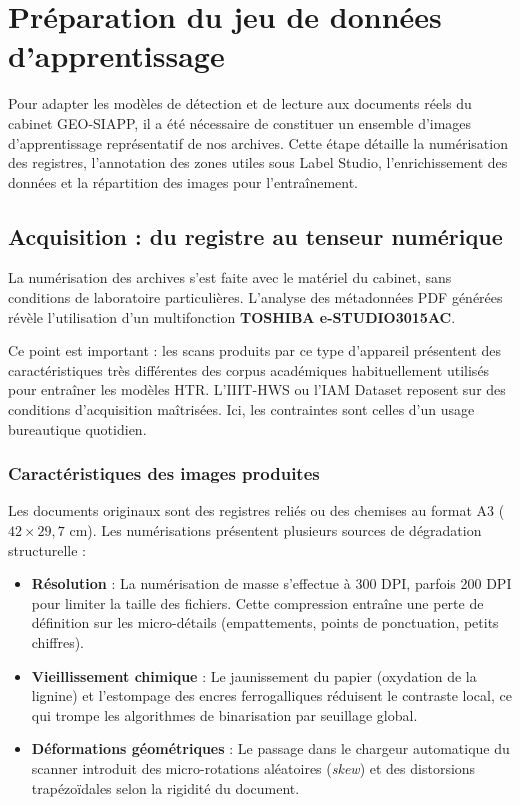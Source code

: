 \section{Préparation du jeu de données d'apprentissage}
\label{sec:dataset}

Pour adapter les modèles de détection et de lecture aux documents réels du cabinet GEO-SIAPP, il a été nécessaire de constituer un ensemble d'images d'apprentissage représentatif de nos archives. Cette étape détaille la numérisation des registres, l'annotation des zones utiles sous Label Studio, l'enrichissement des données et la répartition des images pour l'entraînement.


\subsection{Acquisition : du registre au tenseur numérique}

La numérisation des archives s'est faite avec le matériel du cabinet, sans conditions de laboratoire particulières. L'analyse des métadonnées PDF générées révèle l'utilisation d'un multifonction \textbf{TOSHIBA e-STUDIO3015AC}.

Ce point est important : les scans produits par ce type d'appareil présentent des caractéristiques très différentes des corpus académiques habituellement utilisés pour entraîner les modèles HTR. L'IIIT-HWS ou l'IAM Dataset reposent sur des conditions d'acquisition maîtrisées. Ici, les contraintes sont celles d'un usage bureautique quotidien.

\subsubsection{Caractéristiques des images produites}

Les documents originaux sont des registres reliés ou des chemises au format A3 ($42 \times 29{,}7$ cm). Les numérisations présentent plusieurs sources de dégradation structurelle :
\begin{itemize}
    \item \textbf{Résolution} : La numérisation de masse s'effectue à 300 DPI, parfois 200 DPI pour limiter la taille des fichiers. Cette compression entraîne une perte de définition sur les micro-détails (empattements, points de ponctuation, petits chiffres).
    \item \textbf{Vieillissement chimique} : Le jaunissement du papier (oxydation de la lignine) et l'estompage des encres ferrogalliques réduisent le contraste local, ce qui trompe les algorithmes de binarisation par seuillage global.
    \item \textbf{Déformations géométriques} : Le passage dans le chargeur automatique du scanner introduit des micro-rotations aléatoires (\textit{skew}) et des distorsions trapézoïdales selon la rigidité du document.
\end{itemize}


